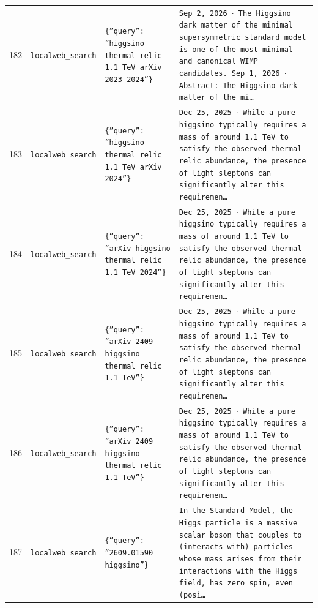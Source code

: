 \documentclass[11pt,a4paper]{article}
\begin{document}
\begin{longtable}{@{}p{}p{}p{}p{}@{}}
182 & \texttt{local}\newline\texttt{web\_\allowbreak{}search} & \texttt{\{''query'':\allowbreak{} ''higgsino thermal relic 1.1 TeV arXiv 2023 2024''\}\allowbreak{}} & \texttt{Sep 2,\allowbreak{} 2026 $\cdot$ The Higgsino dark matter of the minimal supersymmetric standard model is one of the most minimal and canonical WIMP candidates. Sep 1,\allowbreak{} 2026 $\cdot$ Abstract:\allowbreak{} The Higgsino dark matter of the mi\ldots{}\allowbreak{}} \\
183 & \texttt{local}\newline\texttt{web\_\allowbreak{}search} & \texttt{\{''query'':\allowbreak{} ''higgsino thermal relic 1.1 TeV arXiv 2024''\}\allowbreak{}} & \texttt{Dec 25,\allowbreak{} 2025 $\cdot$ While a pure higgsino typically requires a mass of around 1.1 TeV to satisfy the observed thermal relic abundance,\allowbreak{} the presence of light sleptons can significantly alter this requiremen\ldots{}\allowbreak{}} \\
184 & \texttt{local}\newline\texttt{web\_\allowbreak{}search} & \texttt{\{''query'':\allowbreak{} ''arXiv higgsino thermal relic 1.1 TeV 2024''\}\allowbreak{}} & \texttt{Dec 25,\allowbreak{} 2025 $\cdot$ While a pure higgsino typically requires a mass of around 1.1 TeV to satisfy the observed thermal relic abundance,\allowbreak{} the presence of light sleptons can significantly alter this requiremen\ldots{}\allowbreak{}} \\
185 & \texttt{local}\newline\texttt{web\_\allowbreak{}search} & \texttt{\{''query'':\allowbreak{} ''arXiv 2409 higgsino thermal relic 1.1 TeV''\}\allowbreak{}} & \texttt{Dec 25,\allowbreak{} 2025 $\cdot$ While a pure higgsino typically requires a mass of around 1.1 TeV to satisfy the observed thermal relic abundance,\allowbreak{} the presence of light sleptons can significantly alter this requiremen\ldots{}\allowbreak{}} \\
186 & \texttt{local}\newline\texttt{web\_\allowbreak{}search} & \texttt{\{''query'':\allowbreak{} ''arXiv 2409 higgsino thermal relic 1.1 TeV''\}\allowbreak{}} & \texttt{Dec 25,\allowbreak{} 2025 $\cdot$ While a pure higgsino typically requires a mass of around 1.1 TeV to satisfy the observed thermal relic abundance,\allowbreak{} the presence of light sleptons can significantly alter this requiremen\ldots{}\allowbreak{}} \\
187 & \texttt{local}\newline\texttt{web\_\allowbreak{}search} & \texttt{\{''query'':\allowbreak{} ''2609.01590 higgsino''\}\allowbreak{}} & \texttt{In the Standard Model,\allowbreak{} the Higgs particle is a massive scalar boson that couples to (interacts with)\allowbreak{} particles whose mass arises from their interactions with the Higgs field,\allowbreak{} has zero spin,\allowbreak{} even (posi\ldots{}\allowbreak{}} \\

\end{longtable}
\end{document}
